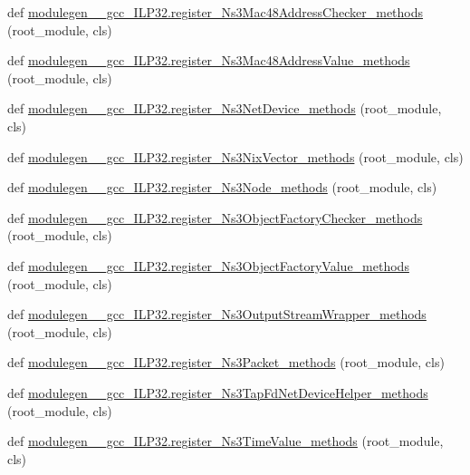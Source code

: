 \begin{DoxyCompactItemize}
\item 
def \hyperlink{namespacemodulegen____gcc__ILP32_a9a21f6afbd8086013a32b274dbadbbfe}{modulegen\+\_\+\+\_\+gcc\+\_\+\+I\+L\+P32.\+register\+\_\+\+Ns3\+Mac48\+Address\+Checker\+\_\+methods} (root\+\_\+module, cls)
\item 
def \hyperlink{namespacemodulegen____gcc__ILP32_acd3d4984a8cfb1ebfef0f6abc746e62c}{modulegen\+\_\+\+\_\+gcc\+\_\+\+I\+L\+P32.\+register\+\_\+\+Ns3\+Mac48\+Address\+Value\+\_\+methods} (root\+\_\+module, cls)
\item 
def \hyperlink{namespacemodulegen____gcc__ILP32_a88fafb58aa743dae1a3acfbbb6787697}{modulegen\+\_\+\+\_\+gcc\+\_\+\+I\+L\+P32.\+register\+\_\+\+Ns3\+Net\+Device\+\_\+methods} (root\+\_\+module, cls)
\item 
def \hyperlink{namespacemodulegen____gcc__ILP32_a9b2d434ab0f4ea1d861923f9a09be052}{modulegen\+\_\+\+\_\+gcc\+\_\+\+I\+L\+P32.\+register\+\_\+\+Ns3\+Nix\+Vector\+\_\+methods} (root\+\_\+module, cls)
\item 
def \hyperlink{namespacemodulegen____gcc__ILP32_a2500f4dcd70d582b086c6ce23502e83c}{modulegen\+\_\+\+\_\+gcc\+\_\+\+I\+L\+P32.\+register\+\_\+\+Ns3\+Node\+\_\+methods} (root\+\_\+module, cls)
\item 
def \hyperlink{namespacemodulegen____gcc__ILP32_aee073757310c9de4d2861b5c4b4eee5c}{modulegen\+\_\+\+\_\+gcc\+\_\+\+I\+L\+P32.\+register\+\_\+\+Ns3\+Object\+Factory\+Checker\+\_\+methods} (root\+\_\+module, cls)
\item 
def \hyperlink{namespacemodulegen____gcc__ILP32_a7505caf7d909001e889b89ce94143f4a}{modulegen\+\_\+\+\_\+gcc\+\_\+\+I\+L\+P32.\+register\+\_\+\+Ns3\+Object\+Factory\+Value\+\_\+methods} (root\+\_\+module, cls)
\item 
def \hyperlink{namespacemodulegen____gcc__ILP32_a8e9fcb242da1166eddf53267a12bfdbb}{modulegen\+\_\+\+\_\+gcc\+\_\+\+I\+L\+P32.\+register\+\_\+\+Ns3\+Output\+Stream\+Wrapper\+\_\+methods} (root\+\_\+module, cls)
\item 
def \hyperlink{namespacemodulegen____gcc__ILP32_ac954ddbcc06ada408c4168d841f1ac53}{modulegen\+\_\+\+\_\+gcc\+\_\+\+I\+L\+P32.\+register\+\_\+\+Ns3\+Packet\+\_\+methods} (root\+\_\+module, cls)
\item 
def \hyperlink{namespacemodulegen____gcc__ILP32_a49111242ed076fb3acbf7222448fab75}{modulegen\+\_\+\+\_\+gcc\+\_\+\+I\+L\+P32.\+register\+\_\+\+Ns3\+Tap\+Fd\+Net\+Device\+Helper\+\_\+methods} (root\+\_\+module, cls)
\item 
def \hyperlink{namespacemodulegen____gcc__ILP32_a1105d61b4c389df61b8b83b0a25cc654}{modulegen\+\_\+\+\_\+gcc\+\_\+\+I\+L\+P32.\+register\+\_\+\+Ns3\+Time\+Value\+\_\+methods} (root\+\_\+module, cls)

\end{DoxyCompactItemize}
